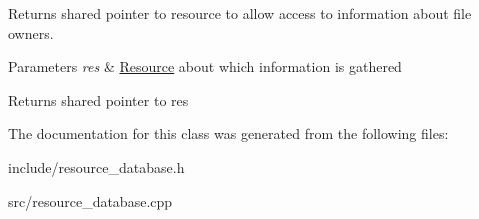 Returns shared pointer to resource to allow access to information about file owners. 


\begin{DoxyParams}{Parameters}
{\em res} & \hyperlink{classsimpleP2P_1_1Resource}{Resource} about which information is gathered \\
\hline
\end{DoxyParams}
\begin{DoxyReturn}{Returns}
shared pointer to res 
\end{DoxyReturn}


The documentation for this class was generated from the following files\+:\begin{DoxyCompactItemize}
\item 
include/resource\+\_\+database.\+h\item 
src/resource\+\_\+database.\+cpp\end{DoxyCompactItemize}
